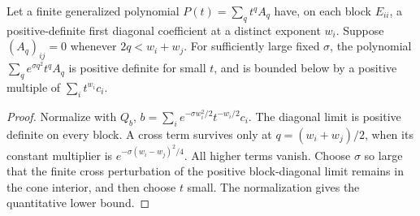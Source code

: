 \begin{lemma}\label{lem:rescale}
Let a finite generalized polynomial $P(t)=\sum_qt^q A_q$ have, on each block $E_{ii}$, a positive-definite first diagonal coefficient at a distinct exponent $w_i$. Suppose $(A_q)_{ij}=0$ whenever $2q<w_i+w_j$. For sufficiently large fixed $\sigma$, the polynomial $\sum_qe^{\sigma q^2}t^qA_q$ is positive definite for small $t$, and is bounded below by a positive multiple of $\sum_i t^{w_i}c_i$.
\end{lemma}
\begin{proof}
Normalize with $Q_b$, $b=\sum_i e^{-\sigma w_i^2/2}t^{-w_i/2}c_i$. The diagonal limit is positive definite on every block. A cross term survives only at $q=(w_i+w_j)/2$, when its constant multiplier is $e^{-\sigma(w_i-w_j)^2/4}$. All higher terms vanish. Choose $\sigma$ so large that the finite cross perturbation of the positive block-diagonal limit remains in the cone interior, and then choose $t$ small. The normalization gives the quantitative lower bound.
\end{proof}

